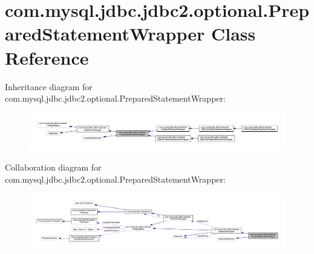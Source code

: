 \hypertarget{classcom_1_1mysql_1_1jdbc_1_1jdbc2_1_1optional_1_1_prepared_statement_wrapper}{}\section{com.\+mysql.\+jdbc.\+jdbc2.\+optional.\+Prepared\+Statement\+Wrapper Class Reference}
\label{classcom_1_1mysql_1_1jdbc_1_1jdbc2_1_1optional_1_1_prepared_statement_wrapper}


Inheritance diagram for com.\+mysql.\+jdbc.\+jdbc2.\+optional.\+Prepared\+Statement\+Wrapper\+:
\nopagebreak
\begin{figure}[H]
\begin{center}
\leavevmode
\includegraphics[width=350pt]{classcom_1_1mysql_1_1jdbc_1_1jdbc2_1_1optional_1_1_prepared_statement_wrapper__inherit__graph}
\end{center}
\end{figure}


Collaboration diagram for com.\+mysql.\+jdbc.\+jdbc2.\+optional.\+Prepared\+Statement\+Wrapper\+:
\nopagebreak
\begin{figure}[H]
\begin{center}
\leavevmode
\includegraphics[width=350pt]{classcom_1_1mysql_1_1jdbc_1_1jdbc2_1_1optional_1_1_prepared_statement_wrapper__coll__graph}
\end{center}
\end{figure}

